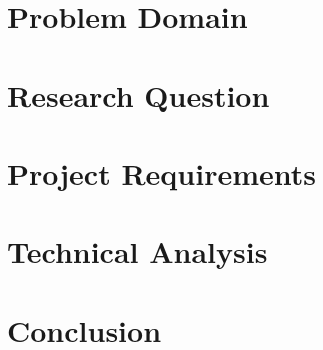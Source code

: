 \documentclass[11pt]{article}
\begin{document}
  \section{Problem Domain}
  
  \section{Research Question}
  
  \section{Project Requirements}
  
  \section{Technical Analysis}
  
   \section{Conclusion}
  









	
\end{document}
